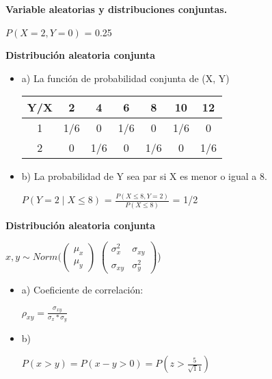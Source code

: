 \documentclass{oxmathproblems}
\begin{document}
\begin{questions}

\miquestion \textbf {Variable aleatorias y distribuciones conjuntas.}

$P(X=2,Y=0) $ = 0.25



\miquestion\textbf{Distribución aleatoria conjunta}
\begin{itemize}
\item  a) La función de probabilidad conjunta de (X, Y)

\begin{center}
\begin{tabular}{ |c|c|c|c|c|c|c| } 
\hline
Y/X & 2 & 4 & 6 & 8 & 10 & 12 \\
\hline
1 & 1/6 & 0 & 1/6 & 0 & 1/6 & 0 \\
2 & 0 & 1/6 & 0 & 1/6 & 0 & 1/6 \\
\hline
\end{tabular}
\end{center}

\item  b) La probabilidad de Y sea par si X es menor o igual a 8. 


$P(Y = 2 \mid X \leq 8)$ =  $\frac{P(X \leq 8,Y = 2)}{P(X \leq 8)}$
= 1/2
\end{itemize}


\miquestion\textbf{Distribución aleatoria conjunta}

$ x,y \sim Norm(\begin{pmatrix} \mu_x \\ \mu_y \end{pmatrix} $ $\begin{pmatrix} \sigma_x^2  & \sigma_{xy}\\ \sigma_{xy} & \sigma_{y}^2\end{pmatrix} $) 


\begin{itemize}
\item  a) Coeficiente de correlación: 

 $ \rho_{xy} = \frac{\sigma_{xy}}{\sigma_x * \sigma_y} $ 



\item  b) 


$ P(x>y) = P (x-y >0) = P (z > \frac{5}{\sqrt11}) $ 


\end{itemize}
\end{questions}
\end{document}
